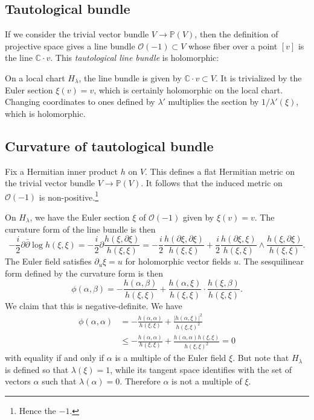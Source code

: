 \documentclass[11pt]{article}
\newcommand{\kk}[1]{\mathbb{#1}}
\newcommand{\cc}[1]{\mathcal{#1}}
\begin{document}
\subsection{Tautological bundle}


If we consider the trivial vector bundle $V \to \kk P(V)$, then the definition of projective space gives a line bundle $\cc O(-1) \subset V$ whose fiber over a point $[v]$ is
the line $\kk C \cdot v$. This \emph{tautological line bundle} is holomorphic:

On a local chart $H_\lambda$, the line bundle is given by $\kk C \cdot v \subset V$. It is trivialized by the Euler section $\xi(v) = v$, which is certainly holomorphic on the local chart. Changing coordinates to ones defined by $\lambda'$ multiplies the section by $1/\lambda'(\xi)$, which is holomorphic.



\subsection{Curvature of tautological bundle}

Fix a Hermitian inner product $h$ on $V$. This defines a flat Hermitian metric on the trivial vector bundle $V \to \kk P(V)$. It follows that the induced metric on $\cc O(-1)$ is non-positive.\footnote{Hence the $-1$.}

On $H_\lambda$, we have the Euler section $\xi$ of $\cc O(-1)$ given by $\xi(v) = v$. The curvature form of the line bundle is then
$$
-\frac i2 \partial \bar\partial \log h(\xi, \xi)
= -\frac i2\partial \frac{h(\xi, \partial \xi)}{h(\xi, \xi)}
= -\frac i2\frac{h(\partial \xi, \partial \xi)}{h(\xi, \xi)}
+ \frac i2\frac{h(\partial \xi, \xi)}{h(\xi, \xi)} \wedge \frac{h(\xi, \partial \xi)}{h(\xi, \xi)}.
$$
The Euler field satisfies $\partial_u \xi = u$ for holomorphic vector fields $u$. The sesquilinear form defined by the curvature form is then
$$
\phi(\alpha, \beta)
= -\frac{h(\alpha, \beta)}{h(\xi, \xi)}
+ \frac{h(\alpha, \xi)}{h(\xi, \xi)} \cdot \frac{h(\xi, \beta)}{h(\xi, \xi)}.
$$
We claim that this is negative-definite. We have
\begin{align*}
\phi(\alpha, \alpha)
&= -\frac{h(\alpha, \alpha)}{h(\xi, \xi)}
+ \frac{|h(\alpha, \xi)|^2}{h(\xi, \xi)^2}
\\
&\leq -\frac{h(\alpha, \alpha)}{h(\xi, \xi)}
+ \frac{h(\alpha, \alpha) h(\xi, \xi)}{h(\xi, \xi)^2}
= 0
\end{align*}
with equality if and only if $\alpha$ is a multiple of the Euler field $\xi$. But note that $H_\lambda$ is defined so that $\lambda(\xi) = 1$, while its tangent space identifies with the set of vectors $\alpha$ such that $\lambda(\alpha) = 0$. Therefore $\alpha$ is not a multiple of $\xi$.
\end{document}
